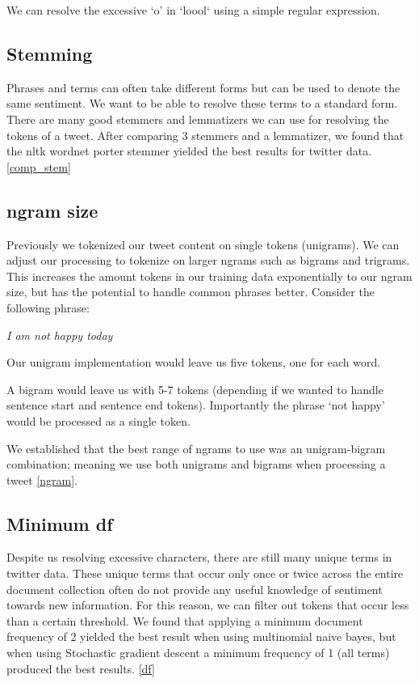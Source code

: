 We can resolve the excessive `o' in `loool` using a simple regular expression. 

\subsection{Stemming} \label{stemming_pre}

Phrases and terms can often take different forms but can be used to denote the same sentiment. We want to be able to resolve these terms to a standard form. There are many good stemmers and lemmatizers we can use for resolving the tokens of a tweet.  After comparing 3 stemmers and a lemmatizer, we found that the nltk wordnet porter stemmer yielded the best results for twitter data. \ref{comp_stem}

\subsection{ngram size} \label{ngram_size_proc}

Previously we tokenized our tweet content on single tokens (unigrams). We can adjust our processing to tokenize on larger ngrams such as bigrams and trigrams. This increases the amount tokens in our training data exponentially to our ngram size, but has the potential to handle common phrases better. Consider the following phrase:

\begin{center}
\textit {I am not happy today}
\end{center}

Our unigram implementation would leave us five tokens, one for each word.

A bigram would leave us with 5-7 tokens (depending if we wanted to handle sentence start and sentence end tokens). Importantly the phrase `not happy' would be processed as a single token.

We established that the best range of ngrams to use was an unigram-bigram combination; meaning we use both unigrams and bigrams when processing a tweet \ref{ngram}.

\subsection{Minimum df} \label{min_df_pro}

Despite us resolving excessive characters, there are still many unique terms in twitter data. These unique terms that occur only once or twice across the entire document collection often do not provide any useful knowledge of sentiment towards new information. For this reason, we can filter out tokens that occur less than a certain threshold. We found that applying a minimum document frequency of 2 yielded the best result when using multinomial naive bayes, but when using Stochastic gradient descent a minimum frequency of 1 (all terms) produced the best results. \ref{df}

